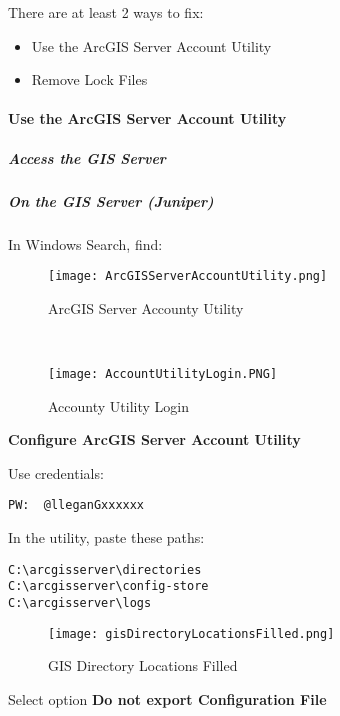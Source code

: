\noindent There are at least 2 ways to fix:
\begin{itemize}
\item Use the ArcGIS Server Account Utility
\item Remove Lock Files
\end{itemize}
\paragraph[Use the ArcGIS Server Account Utility]{Use the ArcGIS Server Account Utility\texorpdfstring{\\}{}}
\subparagraph*{Access the GIS Server\texorpdfstring{\\}{}}
\vspace{.25in}

\vspace{.25in}

\vspace{.25in}

\clearpage
\subparagraph*{On the GIS Server (Juniper)\texorpdfstring{\\}{}}
\noindent In Windows Search, find:
\vspace{.1in}

\begin{wrapfigure}{r}{0.5\textwidth}
\centering
\texttt{[image: ArcGISServerAccountUtility.png]}
\caption{ArcGIS Server Accounty Utility}
\vspace{.25in}
\HRule \\[.4cm] %
\vspace{.25in}

\texttt{[image: AccountUtilityLogin.PNG]}
\caption{Accounty Utility Login}
\end{wrapfigure}
\noindent \textbf{Configure ArcGIS Server Account Utility}
\vspace{4in}

\noindent Use credentials:
\vspace{.35in}

\begin{verbatim}
PW:  @lleganGxxxxxx
\end{verbatim}
\clearpage
\noindent In the utility, paste these paths:
\begin{verbatim}
C:\arcgisserver\directories
C:\arcgisserver\config-store
C:\arcgisserver\logs
\end{verbatim}
\begin{figure}[h!]
\centering
\texttt{[image: gisDirectoryLocationsFilled.png]}
\caption{GIS Directory Locations Filled}
\end{figure}
\clearpage
\noindent Select option \textbf{Do not export Configuration File}

